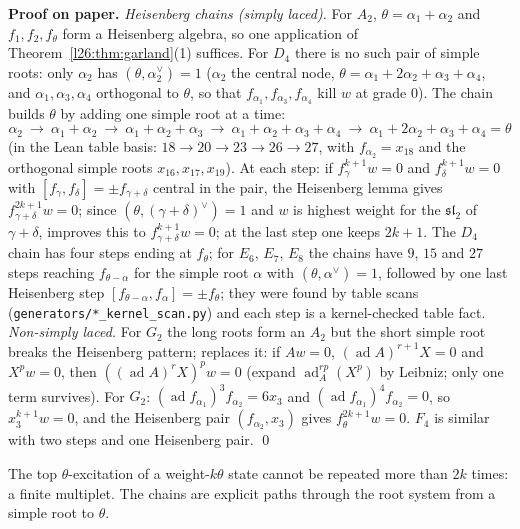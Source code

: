 \textbf{Proof on paper.} \emph{Heisenberg chains (simply laced).} For $A_2$, $\theta=\alpha_1+\alpha_2$ and $f_1,f_2,f_\theta$ form a Heisenberg
algebra, so one application of Theorem~\ref{l26:thm:garland}(1) suffices. For $D_4$ there is no such pair of simple roots: only $\alpha_2$
has $(\theta,\alpha_2^\vee)=1$ ($\alpha_2$ the central node, $\theta=\alpha_1+2\alpha_2+\alpha_3+\alpha_4$, and $\alpha_1,\alpha_3,\alpha_4$
orthogonal to $\theta$, so that $f_{\alpha_1},f_{\alpha_3},f_{\alpha_4}$ kill $w$ at grade $0$). The chain builds $\theta$ by adding one
simple root at a time:
\begin{equation*}
\alpha_2\ \to\ \alpha_1+\alpha_2\ \to\ \alpha_1+\alpha_2+\alpha_3\ \to\ \alpha_1+\alpha_2+\alpha_3+\alpha_4\ \to\ \alpha_1+2\alpha_2+\alpha_3+\alpha_4=\theta
\end{equation*}
(in the Lean table basis: $18\to20\to23\to26\to27$, with $f_{\alpha_2}=x_{18}$ and the orthogonal simple roots $x_{16},x_{17},x_{19}$).
At each step: if $f_\gamma^{k+1}w=0$ and $f_\delta^{k+1}w=0$ with $[f_\gamma,f_\delta]=\pm f_{\gamma+\delta}$ central in the pair, the
Heisenberg lemma gives $f_{\gamma+\delta}^{2k+1}w=0$; since $(\theta,(\gamma+\delta)^\vee)=1$ and $w$ is highest weight for the
$\mathfrak{sl}_2$ of $\gamma+\delta$,  improves this to $f_{\gamma+\delta}^{k+1}w=0$; at the last step one keeps
$2k+1$. The $D_4$ chain has four steps ending at $f_\theta$; for $E_6$, $E_7$, $E_8$ the chains have $9$, $15$ and $27$ steps reaching $f_{\theta-\alpha}$ for the simple root $\alpha$ with $(\theta,\alpha^\vee)=1$, followed by one last Heisenberg step $[f_{\theta-\alpha},f_\alpha]=\pm f_\theta$; they were found by table scans
(\texttt{generators/*\_kernel\_scan.py}) and each step is a kernel-checked table fact. \emph{Non-simply laced.} For $G_2$ the long
roots form an $A_2$ but the short simple root breaks the Heisenberg pattern;  replaces it: if $Aw=0$,
$(\operatorname{ad}A)^{r+1}X=0$ and $X^pw=0$, then $((\operatorname{ad}A)^rX)^pw=0$ (expand $\operatorname{ad}_A^{rp}(X^p)$ by Leibniz;
only one term survives). For $G_2$: $(\operatorname{ad}f_{\alpha_1})^3f_{\alpha_2}=6x_3$ and $(\operatorname{ad}f_{\alpha_1})^4f_{\alpha_2}=0$,
so $x_3^{k+1}w=0$, and the Heisenberg pair $(f_{\alpha_2},x_3)$ gives $f_\theta^{2k+1}w=0$. $F_4$ is similar with two
 steps and one Heisenberg pair. \qed

\begin{physics}
The top $\theta$-excitation of a weight-$k\theta$ state cannot be repeated more than $2k$ times: a finite multiplet. The
chains are explicit paths through the root system from a simple root to $\theta$.
\end{physics}

